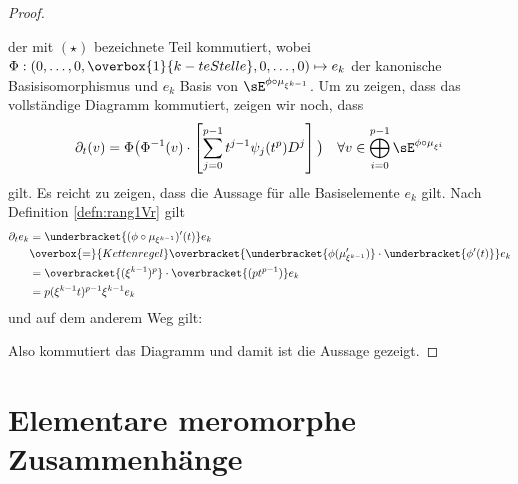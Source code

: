\begin{proof}
\begin{center}
\end{center}
der mit $(\star)$ bezeichnete Teil kommutiert,
wobei $\Phi:(0,\dots,0,\overbox{1}{k-te Stelle},0,\dots,0)\mapsto e_k$ der
kanonische Basisisomorphismus und $e_k$ Basis von
$\sE^{\phi\circ\mu_{\xi^{k-1}}}$.
Um zu zeigen, dass das vollständige Diagramm kommutiert, zeigen wir noch, dass
\begin{align*}
\partial_t(v) =\Phi\big(\Phi^{-1}(v)
  \cdot\left[\sum_{j=0}^{p-1}t^{j-1}\psi_j(t^p)D^j\right]\big)
& & \forall v\in \bigoplus_{i=0}^{p-1}\sE^{\phi\circ\mu_{\xi^i}} \\
\end{align*}
gilt. Es reicht zu zeigen, dass die Aussage für alle Basiselemente $e_k$ gilt.
Nach Definition \ref{defn:rang1Vr} gilt
\begin{align*}
\partial_t e_k &= \underbracket{(\phi\circ\mu_{\xi^{k-1}})'(t)}e_k
\\&\overbox{=}{Kettenregel}
  \overbracket{\underbracket{\phi(\mu_{\xi^{k-1}}')}
  \cdot\underbracket{\phi'(t)}}e_k
\\&=\overbracket{(\xi^{k-1})^p}\cdot\overbracket{(pt^{p-1})}e_k
\\&=p(\xi^{k-1}t)^{p-1}\xi^{k-1}e_k
\end{align*}
und auf dem anderem Weg gilt:
\begin{center}
\end{center}
Also kommutiert das Diagramm und damit ist die Aussage gezeigt.
\end{proof}

\section{Elementare meromorphe Zusammenhänge}
\begin{comment}
einführen als Bausteine oder kleinste meromorphe Zusammenhänge
\end{comment}


